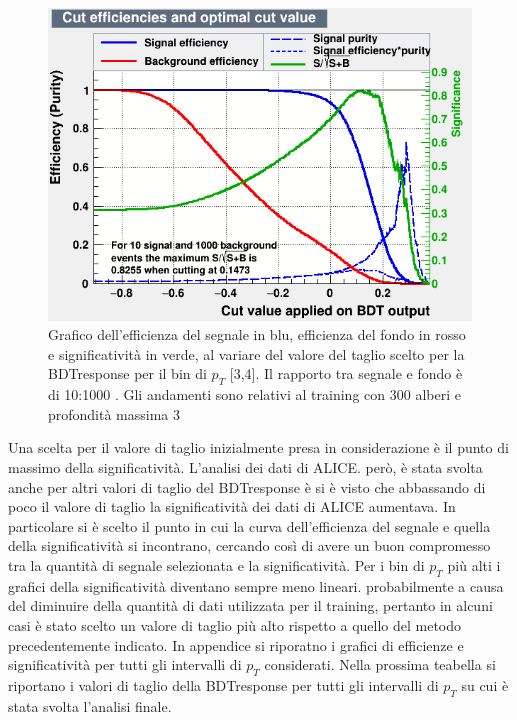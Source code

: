     \begin{figure}[htbp] 
        \centering
        \includegraphics[width=0.7\linewidth]{training&testing/effBDT/effBDT_rapp_3_4.png}
        \caption{Grafico dell'efficienza del segnale in blu, efficienza del fondo in rosso e significatività in verde, al variare del valore del taglio scelto per la BDTresponse per il bin di $p_T$ [3,4]. Il rapporto tra segnale e fondo è di 10:1000 . Gli andamenti sono relativi al training con 300 alberi e profondità massima 3
        }
        \label{fig:effBDT_10_1000}
    \end{figure}
    
Una scelta per il valore di taglio inizialmente presa in considerazione è il punto di massimo della significatività. L'analisi dei dati di ALICE. però, è stata svolta anche per altri valori di taglio del BDTresponse è si è visto che abbassando di poco il valore di taglio la significatività dei dati di ALICE aumentava. In particolare si è scelto il punto in cui la curva dell'efficienza del segnale e quella della significatività si incontrano, cercando così di avere un buon compromesso tra la quantità di segnale selezionata e la significatività. Per i bin di $p_T$ più alti i grafici della significatività diventano sempre meno lineari. probabilmente a causa del diminuire della quantità di dati utilizzata per il training, pertanto in alcuni casi è stato scelto un valore di taglio più alto rispetto a quello del metodo precedentemente indicato. In appendice si riporatno i grafici di efficienze e significatività per tutti gli intervalli di $p_T$ considerati.
Nella prossima teabella si riportano i valori di taglio della BDTresponse per tutti gli intervalli di $p_T$ su cui è stata svolta l'analisi finale.

